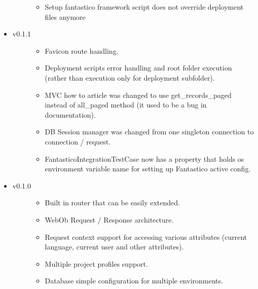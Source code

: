 \documentclass[letterpaper,10pt,english]{sphinxmanual}
\begin{document}
\begin{itemize}
\begin{description}
\begin{itemize}
\item {} 
Setup fantastico framework script does not override deployment files anymore

\end{itemize}

\end{description}

\item {} \begin{description}
\item[{v0.1.1}] \leavevmode\begin{itemize}
\item {} 
Favicon route handling.

\item {} 
Deployment scripts error handling and root folder execution (rather than execution only for deployment subfolder).

\item {} 
MVC how to article was changed to use get\_records\_paged instead of all\_paged method (it used to be a bug in documentation).

\item {} 
DB Session manager was changed from one singleton connection to connection / request.

\item {} 
FantasticoIntegrationTestCase now has a property that holds os environment variable name for setting up Fantastico active config.

\end{itemize}

\end{description}

\item {} \begin{description}
\item[{v0.1.0}] \leavevmode\begin{itemize}
\item {} 
Built in router that can be easily extended.

\item {} 
WebOb Request / Response architecture.

\item {} 
Request context support for accessing various attributes (current language, current user and other attributes).

\item {} 
Multiple project profiles support.

\item {} 
Database simple configuration for multiple environments.


\end{itemize}
\end{description}
\end{itemize}
\end{document}
